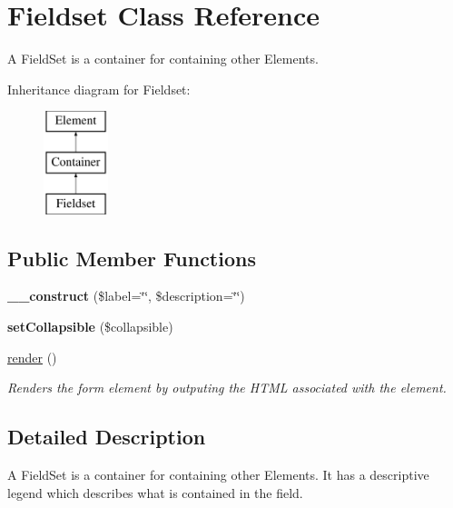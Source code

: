 \hypertarget{class_fieldset}{
\section{Fieldset Class Reference}
\label{class_fieldset}
}


A FieldSet is a container for containing other Elements.  


Inheritance diagram for Fieldset:\begin{figure}[H]
\begin{center}
\leavevmode
\includegraphics[height=3.000000cm]{class_fieldset}
\end{center}
\end{figure}
\subsection*{Public Member Functions}
\begin{DoxyCompactItemize}
\item 
\hypertarget{class_fieldset_a070f543e2e10520d9066cef0c32e9618}{
{\bfseries \_\-\_\-construct} (\$label=\char`\"{}\char`\"{}, \$description=\char`\"{}\char`\"{})}
\label{class_fieldset_a070f543e2e10520d9066cef0c32e9618}

\item 
\hypertarget{class_fieldset_a923881b3c1be3617d638f191756f63ac}{
{\bfseries setCollapsible} (\$collapsible)}
\label{class_fieldset_a923881b3c1be3617d638f191756f63ac}

\item 
\hyperlink{class_fieldset_ab60f99613be79c6dcca2f1f18dfbba13}{render} ()
\begin{DoxyCompactList}\small\item\em Renders the form element by outputing the HTML associated with the element. \item\end{DoxyCompactList}\end{DoxyCompactItemize}


\subsection{Detailed Description}
A FieldSet is a container for containing other Elements. It has a descriptive legend which describes what is contained in the field. 

